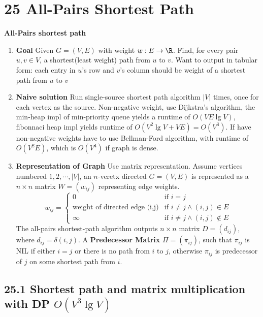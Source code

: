 \documentclass[11pt]{article}
\begin{document}
\section*{25 All-Pairs Shortest Path} 


\begin{defn*}
    \textbf{All-Pairs shortest path}
    \begin{enumerate}
        \item \textbf{Goal} Given $G = (V,E)$ with weight $w:E\to\R$. Find, for every pair $u,v\in V$, a shortest(least weight) path from $u$ to $v$. Want to output in tabular form: each entry in $u$'s row and $v$'s column should be weight of a shortest path from $u$ to $v$
        \item \textbf{Naive solution} Run single-source shortest path algorithm $|V|$ times, once for each vertex as the source. Non-negative weight, use Dijkstra's algorithm, the min-heap impl of min-priority queue yields a runtime of $O(VE\lg V)$, fibonnaci heap impl yields runtime of $O(V^2 \lg V + VE) = O(V^3)$. If have non-negative weights have to use Bellman-Ford algorithm, with runtime of $O(V^2E)$, which is $O(V^4)$ if graph is dense.
        \item \textbf{Representation of Graph} Use matrix representation. Assume vertices numbered $1,2,\cdots, |V|$, an $n$-veretx directed $G =  (V,E)$ is represented as a $n\times n$ matrix $W = (w_{ij})$ representing edge weights. 
        \[
            w_{ij} = 
            \begin{cases}
                0 & \text{if } i = j\\
                \text{weight of directed edge (i,j)} & \text{if } i\neq j \land (i,j)\in E \\
                \infty & \text{if } i\neq j \land (i,j) \not\in E
            \end{cases}
        \]
        The all-pairs shortest-path algorithm outputs $n\times n$ matrix $D = (d_{ij})$, where $d_{ij} = \delta(i, j)$. A \textbf{Predecessor Matrix} $\Pi = (\pi_{ij})$, such that $\pi_{ij}$ is NIL if either $i = j$ or there is no path from $i$ to $j$, otherwise $\pi_{ij}$ is predecessor of $j$ on some shortest path from $i$. 
    \end{enumerate}
\end{defn*}


\subsection*{25.1 Shortest path and matrix multiplication with DP $O(V^3 \lg V)$ }
\end{document}
